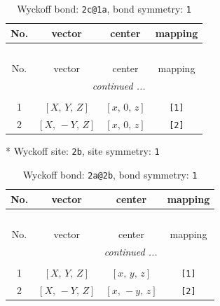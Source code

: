 \documentclass[fleqn,8pt]{jsarticle}
\begin{document}
\begin{longtable}{cccc}
\caption{Wyckoff bond: {\tt 2c@1a}, bond symmetry: {\tt 1}}
 \\
 \hline \hline
No. & vector & center & mapping \\ \hline \endfirsthead

\multicolumn{3}{l}{\tablename\ \thetable{}} \\
 \hline \hline
No. & vector & center & mapping \\ \hline \endhead

 \hline \hline
\multicolumn{3}{r}{\footnotesize\it continued ...} \\ \endfoot

 \hline \hline
\multicolumn{3}{r}{} \\ \endlastfoot

1 & $\left[ X,\, Y,\, Z \right]$ & $\left[ x,\, 0,\, z \right]$ & {\tt [1]} \\ \hline
2 & $\left[ X,\, - Y,\, Z \right]$ & $\left[ x,\, 0,\, z \right]$ & {\tt [2]} \\
\end{longtable}
* Wyckoff site: {\tt 2b}, site symmetry: {\tt 1}
\renewcommand{\arraystretch}{1.2}
\begin{longtable}{cccc}
\caption{Wyckoff bond: {\tt 2a@2b}, bond symmetry: {\tt 1}}
 \\
 \hline \hline
No. & vector & center & mapping \\ \hline \endfirsthead

\multicolumn{3}{l}{\tablename\ \thetable{}} \\
 \hline \hline
No. & vector & center & mapping \\ \hline \endhead

 \hline \hline
\multicolumn{3}{r}{\footnotesize\it continued ...} \\ \endfoot

 \hline \hline
\multicolumn{3}{r}{} \\ \endlastfoot

1 & $\left[ X,\, Y,\, Z \right]$ & $\left[ x,\, y,\, z \right]$ & {\tt [1]} \\ \hline
2 & $\left[ X,\, - Y,\, Z \right]$ & $\left[ x,\, - y,\, z \right]$ & {\tt [2]} \\
\end{longtable}
\end{document}
